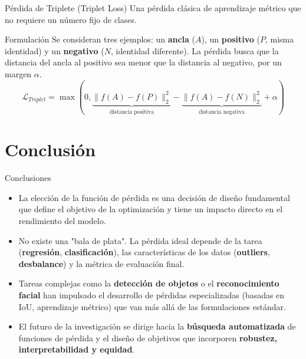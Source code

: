 \documentclass[aspectratio=169, 10pt]{beamer}
\begin{document}
\begin{frame}{Pérdida de Triplete (Triplet Loss)}
    Una pérdida clásica de aprendizaje métrico que no requiere un número fijo de clases.
    
    \begin{block}{Formulación}
        Se consideran tres ejemplos: un \textbf{ancla} ($A$), un \textbf{positivo} ($P$, misma identidad) y un \textbf{negativo} ($N$, identidad diferente). La pérdida busca que la distancia del ancla al positivo sea menor que la distancia al negativo, por un margen $\alpha$.
        $$ \mathcal{L}_{Triplet} = \max\left(0, \underbrace{\|f(A) - f(P)\|_2^2}_{\text{distancia positiva}} - \underbrace{\|f(A) - f(N)\|_2^2}_{\text{distancia negativa}} + \alpha\right) $$
    \end{block}
    
\end{frame}

\section{Conclusión}

\begin{frame}{Conclusiones}
    \begin{itemize}
        \item La elección de la función de pérdida es una decisión de diseño fundamental que define el objetivo de la optimización y tiene un impacto directo en el rendimiento del modelo.
        
        \item No existe una "bala de plata". La pérdida ideal depende de la tarea (\textbf{regresión}, \textbf{clasificación}), las características de los datos (\textbf{outliers}, \textbf{desbalance}) y la métrica de evaluación final.
        
        \item Tareas complejas como la \textbf{detección de objetos} o el \textbf{reconocimiento facial} han impulsado el desarrollo de pérdidas especializadas (basadas en IoU, aprendizaje métrico) que van más allá de las formulaciones estándar.
        
        \item El futuro de la investigación se dirige hacia la \textbf{búsqueda automatizada} de funciones de pérdida y el diseño de objetivos que incorporen \textbf{robustez, interpretabilidad y equidad}.
    \end{itemize}
\end{frame}
\end{document}
